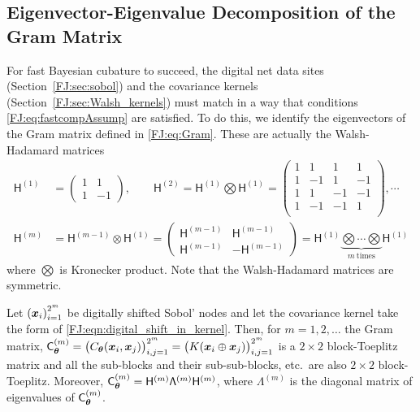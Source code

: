 \documentclass[graybox,footinfo]{svmult}
\begin{document}
\subsection{Eigenvector-Eigenvalue Decomposition of the Gram Matrix}

For fast Bayesian cubature to succeed, the digital net data sites (Section~\ref{FJ:sec:sobol}) and the covariance kernels (Section~\ref{FJ:sec:Walsh_kernels}) must match in a way that conditions \eqref{FJ:eq:fastcompAssump} are satisfied.  To do this, we identify the eigenvectors of the Gram matrix defined in \eqref{FJ:eq:Gram}.  These are actually the Walsh-Hadamard matrices
\begin{align}
\nonumber
\mathsf{H}^{(1)} &=
\begin{pmatrix}
1 & 1 \\ 1 & -1
\end{pmatrix}, \qquad
\mathsf{H}^{(2)} = \mathsf{H}^{(1)} \bigotimes \mathsf{H}^{(1)} = 
\begin{pmatrix}
1 & 1 & 1 & 1 \\ 
1 & -1 & 1 & -1 \\
1 & 1 & -1 & -1 \\ 
1 & -1 & -1 & 1 \\
\end{pmatrix}, \cdots
\\
\label{FJ:eqn:hadamard_matrix}
\mathsf{H}^{(m)} &= \mathsf{H}^{(m-1)} \otimes \mathsf{H}^{(1)} =
\begin{pmatrix}
\mathsf{H}^{(m-1)} & \mathsf{H}^{(m-1)} \\ \mathsf{H}^{(m-1)} & -\mathsf{H}^{(m-1)}
\end{pmatrix} 
= \mathsf{H}^{(1)} \underbrace{\bigotimes \cdots \bigotimes}_{m \ \text{times}}  \mathsf{H}^{(1)} 
\end{align}
where $\bigotimes$ is Kronecker product.
Note that the Walsh-Hadamard matrices are symmetric.

\begin{lemma} \label{FJ:lemma:eig}
    Let $\left({\boldsymbol{x}}_i\right)_{i=1}^{2^m}$ be digitally shifted Sobol' nodes and let the covariance kernel take the form of \eqref{FJ:eqn:digital_shift_in_kernel}. Then, for $m = 1, 2, \ldots$ the Gram matrix, $
	\mathsf{C}_{{\boldsymbol{\theta}}}^{(m)} = \bigl(C_{\boldsymbol{\theta}}({\boldsymbol{x}}_i, {\boldsymbol{x}}_j)\bigr)_{i,j=1}^{2^m} = \bigl(K({\boldsymbol{x}}_i \oplus {\boldsymbol{x}}_j)\bigr)_{i,j=1}^{2^m}$ is a $2\times 2$ block-Toeplitz matrix and all the sub-blocks and their sub-sub-blocks, etc.\ are also $2\times 2$ block-Toeplitz. Moreover, $\mathsf{C}_{{\boldsymbol{\theta}}}^{(m)} = \mathsf{H}^{(m)} \mathsf{\Lambda}^{(m)}\mathsf{H}^{(m)}$, where $\mathsf{\Lambda}^{(m)}$ is the diagonal matrix of eigenvalues of $\mathsf{C}_{{\boldsymbol{\theta}}}^{(m)}$.
\end{lemma}
\end{document}
